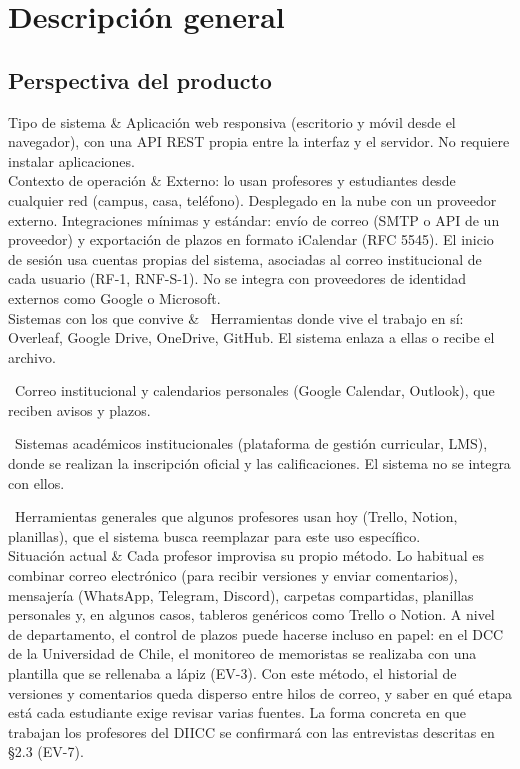 \documentclass[10pt,a4paper]{article}
\newenvironment{kv}[1][4.6cm]
  {\footnotesize\setlength{\extrarowheight}{3pt}\xltabular{\linewidth}{|E{#1}|L|}\hline}
  {\endxltabular}
\newcommand{\kvrow}[2]{#1 & #2 \\ \hline}
\begin{document}
\clearpage
\section{Descripción general}
\subsection{Perspectiva del producto}
\begin{kv}
\kvrow{Tipo de sistema}{Aplicación web responsiva (escritorio y móvil desde el navegador), con una API REST propia entre la interfaz y el servidor. No requiere instalar aplicaciones.}
\kvrow{Contexto de operación}{Externo: lo usan profesores y estudiantes desde cualquier red (campus, casa, teléfono). Desplegado en la nube con un proveedor externo. Integraciones mínimas y estándar: envío de correo (SMTP o API de un proveedor) y exportación de plazos en formato iCalendar (RFC 5545). El inicio de sesión usa cuentas propias del sistema, asociadas al correo institucional de cada usuario (RF-1, RNF-S-1). No se integra con proveedores de identidad externos como Google o Microsoft.}
\kvrow{Sistemas con los que convive}{%
\textbullet~Herramientas donde vive el trabajo en sí: Overleaf, Google Drive, OneDrive, GitHub. El sistema enlaza a ellas o recibe el archivo.\par
\textbullet~Correo institucional y calendarios personales (Google Calendar, Outlook), que reciben avisos y plazos.\par
\textbullet~Sistemas académicos institucionales (plataforma de gestión curricular, LMS), donde se realizan la inscripción oficial y las calificaciones. El sistema no se integra con ellos.\par
\textbullet~Herramientas generales que algunos profesores usan hoy (Trello, Notion, planillas), que el sistema busca reemplazar para este uso específico.}
\kvrow{Situación actual}{Cada profesor improvisa su propio método. Lo habitual es combinar correo electrónico (para recibir versiones y enviar comentarios), mensajería (WhatsApp, Telegram, Discord), carpetas compartidas, planillas personales y, en algunos casos, tableros genéricos como Trello o Notion. A nivel de departamento, el control de plazos puede hacerse incluso en papel: en el DCC de la Universidad de Chile, el monitoreo de memoristas se realizaba con una plantilla que se rellenaba a lápiz (EV-3). Con este método, el historial de versiones y comentarios queda disperso entre hilos de correo, y saber en qué etapa está cada estudiante exige revisar varias fuentes. La forma concreta en que trabajan los profesores del DIICC se confirmará con las entrevistas descritas en §2.3 (EV-7).}
\end{kv}
\end{document}
